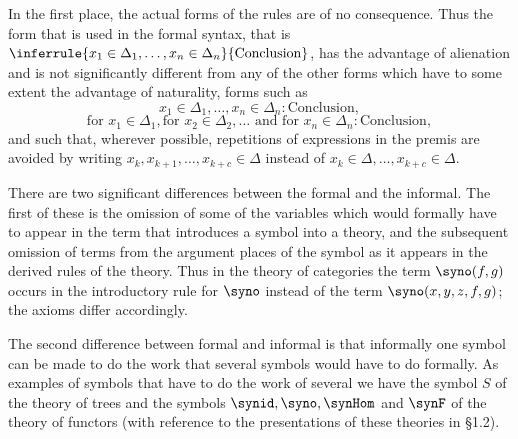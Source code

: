 In the first place, the actual forms of the rules are of no consequence.
%
Thus the form that is used in the formal syntax, that is $\inferrule{x_1\in\Delta_1,\ldots,x_n\in\Delta_n}{\text{Conclusion}}$, has the advantage of alienation and is not significantly different from any of the other forms which have to some extent the advantage of naturality, forms such as
\[x_1\in\Delta_1,\ldots,x_n\in\Delta_n: \text{Conclusion},\]
\[\text{for }x_1\in\Delta_1,\text{for }x_2\in\Delta_2,\ldots \text{ and for }x_n\in\Delta_n: \text{Conclusion},\]
and such that, wherever possible, repetitions of expressions in the premis are avoided by writing $x_k,x_{k+1},\ldots,x_{k+c}\in\Delta$ instead of $x_k\in\Delta,\ldots, x_{k+c}\in\Delta$.

There are two significant differences between the formal and the informal.
%
The first of these is the omission of some of the variables which would formally have to appear in the term that introduces a symbol into a theory, and the subsequent omission of terms from the argument places of the symbol as it appears in the derived rules of the theory.
%
Thus in the theory of categories the term $\syno(f,g)$ occurs in the introductory rule for $\syno$ instead of the term $\syno(x,y,z,f,g)$; the axioms differ accordingly.

The second difference between formal and informal is that informally one symbol can be made to do the work that several symbols would have to do formally.
%
As examples of symbols that have to do the work of several we have the symbol $S$ of the theory of trees and the symbols $\synid,\syno,\synHom$ and $\synF$ of the theory of functors (with reference to the presentations of these theories in \S 1.2).

